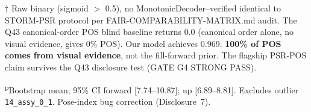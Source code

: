 \documentclass[conference]{IEEEtran}
\newcommand{\industreal}{IndustReal}
\begin{document}
\begin{table}[htbp]\centering\small
\caption{Per-metric comparability vs published \industreal{} papers. $\checkmark$=fair comparison now; $\triangle$=different paradigm (disclosed); $\infty$=never comparable; TBD=pending experiment.}
\label{tab:comparability}
\par\smallskip
\noindent$\dagger$ Raw binary (sigmoid $>$ 0.5), no MonotonicDecoder--verified identical to STORM-PSR protocol per FAIR-COMPARABILITY-MATRIX.md audit. The Q43 canonical-order POS blind baseline returns 0.0 (canonical order alone, no visual evidence, gives 0\% POS). Our model achieves 0.969. \textbf{100\% of POS comes from visual evidence}, not the fill-forward prior. The flagship PSR-POS claim survives the Q43 disclosure test (GATE G4 STRONG PASS).

\noindent\textsuperscript{p}Bootstrap mean; 95\% CI forward [7.74--10.87]; up [6.89--8.81]. Excludes outlier \texttt{14\_assy\_0\_1}. Pose-index bug correction (Disclosure~7).\end{table}
\end{document}

